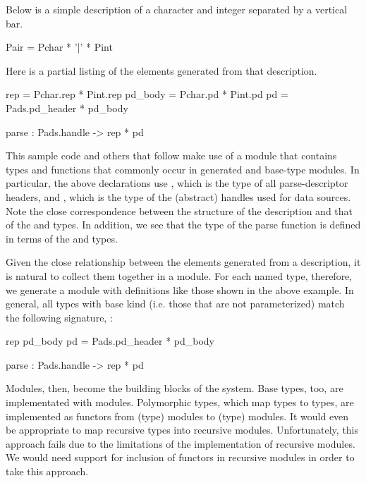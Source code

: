 Below is a simple \padsml{} description of a character
and integer separated by a vertical bar.
\begin{code}\scriptsize
   Pair = Pchar * '|' * Pint\end{code} 
Here is a partial listing of the elements generated from that description.
\begin{code}\scriptsize
{} rep = Pchar.rep * Pint.rep
 pd_body = Pchar.pd  * Pint.pd
 pd = Pads.pd_header * pd_body

 parse : Pads.handle -> rep * pd\end{code} 
This sample code and others that follow make use of a module
 that contains types and functions that commonly occur in
generated and base-type modules. In particular, the above declarations use
, which is the type of all parse-descriptor
headers, and , which is the type of the (abstract)
handles used for data sources.
Note the close correspondence between the structure of the description
and that of the  and  types. In addition, we see
that the type of the parse function is defined in terms of the
 and  types.

Given the close relationship between the elements generated from a
description, it is natural to collect them together in a module. For
each named type, therefore, we generate a module with definitions like
those shown in the above example.
In general, all types with base kind (i.e. those that are not
parameterized) match the following signature,
:
\begin{code}\scriptsize
{} rep
 pd\_body
 pd = Pads.pd_header * pd_body

 parse : Pads.handle -> rep * pd\end{code}

Modules, then, become the building blocks of the \padsml{} system.
Base types, too, are implementated with modules. Polymorphic types,
which map types to types, are implemented as functors from (type)
modules to (type) modules. It would even be appropriate to map
recursive types into recursive modules. Unfortunately, this approach
fails due to the limitations of the \ocaml{} implementation of
recursive modules. We would need support for inclusion of functors in
recursive modules in order to take this approach.

